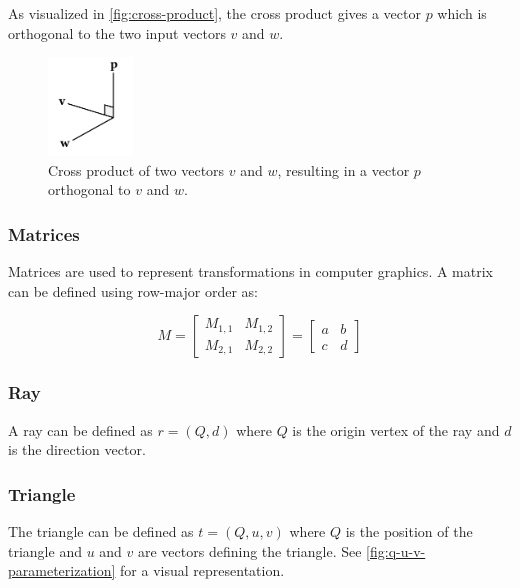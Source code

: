 As visualized in \autoref{fig:cross-product}, the cross product gives a vector $p$ which is orthogonal to the two input vectors $v$ and $w$.

\begin{figure}[H]
  \centering
  \includegraphics[width=0.2\textwidth]{resources/cross-product.png}
  \caption{Cross product of two vectors $v$ and $w$, resulting in a vector $p$ orthogonal to $v$ and $w$.}
  \label{fig:cross-product}
\end{figure}

\subsubsection{Matrices}

Matrices are used to represent transformations in computer graphics. A matrix can be defined using row-major order as:

\begin{equation}
  \label{eqn:matrix}
  M = \begin{bmatrix} M_{1,1} & M_{1,2} \\ M_{2,1} & M_{2,2} \end{bmatrix} = \begin{bmatrix} a & b \\ c & d \end{bmatrix}
\end{equation}

\subsubsection{Ray}

A ray can be defined as $r = (Q, d)$ where $Q$ is the origin vertex of the ray and $d$ is the direction vector.

\subsubsection{Triangle}

The triangle can be defined as $t = (Q, u, v)$ where $Q$ is the position of the triangle and $u$ and $v$ are vectors defining the triangle. See \autoref{fig:q-u-v-parameterization} for a visual representation.

